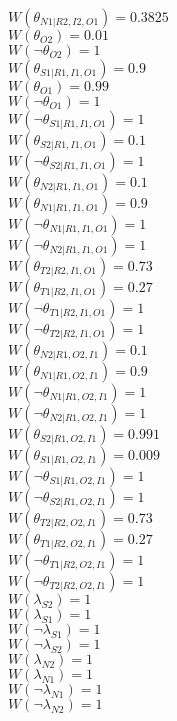 $W(\theta_{N1|R2,I2,O1})=0.3825$\\
$W(\theta_{O2})=0.01$\\
$W(\neg\theta_{O2})=1$\\
$W(\theta_{S1|R1,I1,O1})=0.9$\\
$W(\theta_{O1})=0.99$\\
$W(\neg\theta_{O1})=1$\\
$W(\neg\theta_{S1|R1,I1,O1})=1$\\
$W(\theta_{S2|R1,I1,O1})=0.1$\\
$W(\neg\theta_{S2|R1,I1,O1})=1$\\
$W(\theta_{N2|R1,I1,O1})=0.1$\\
$W(\theta_{N1|R1,I1,O1})=0.9$\\
$W(\neg\theta_{N1|R1,I1,O1})=1$\\
$W(\neg\theta_{N2|R1,I1,O1})=1$\\
$W(\theta_{T2|R2,I1,O1})=0.73$\\
$W(\theta_{T1|R2,I1,O1})=0.27$\\
$W(\neg\theta_{T1|R2,I1,O1})=1$\\
$W(\neg\theta_{T2|R2,I1,O1})=1$\\
$W(\theta_{N2|R1,O2,I1})=0.1$\\
$W(\theta_{N1|R1,O2,I1})=0.9$\\
$W(\neg\theta_{N1|R1,O2,I1})=1$\\
$W(\neg\theta_{N2|R1,O2,I1})=1$\\
$W(\theta_{S2|R1,O2,I1})=0.991$\\
$W(\theta_{S1|R1,O2,I1})=0.009$\\
$W(\neg\theta_{S1|R1,O2,I1})=1$\\
$W(\neg\theta_{S2|R1,O2,I1})=1$\\
$W(\theta_{T2|R2,O2,I1})=0.73$\\
$W(\theta_{T1|R2,O2,I1})=0.27$\\
$W(\neg\theta_{T1|R2,O2,I1})=1$\\
$W(\neg\theta_{T2|R2,O2,I1})=1$\\
$W(\lambda_{S2})=1$\\
$W(\lambda_{S1})=1$\\
$W(\neg\lambda_{S1})=1$\\
$W(\neg\lambda_{S2})=1$\\
$W(\lambda_{N2})=1$\\
$W(\lambda_{N1})=1$\\
$W(\neg\lambda_{N1})=1$\\
$W(\neg\lambda_{N2})=1$\\
